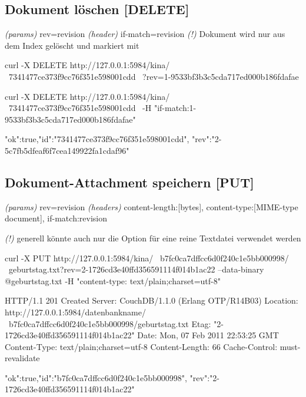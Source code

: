\documentclass[19pt,landscape,twocolumn]{article}
\newcommand{\mono}[1]{\texttt{\textendash\textendash {#1}}}
\newcommand{\htmlverb}[1]{{[}\textbf{{#1}}{]}}
\newcommand{\brackets}[1]{{[}{#1}{]}}
\newcommand{\setparskip}{\setlength{\parskip}{-6mm}}
\newcommand{\resetparskip}{\setlength{\parskip}{1mm}}
\begin{document}
\subsection{Dokument löschen \htmlverb{DELETE}}
\emph{(params)} rev=revision \newline
\emph{(header)} if-match=revision \newline
\emph{(!)} Dokument wird nur aus dem Index gelöscht und markiert \newline
 mit \mono{deleted:true}

\begin{code}
curl -X DELETE http://127.0.0.1:5984/kina/ \
  7341477ce373f9cc76f351e598001cdd \
  ?rev=1-9533bf3b3c5cda717ed000b186fdafae
\end{code}

\begin{code}
curl -X DELETE http://127.0.0.1:5984/kina/ \
  7341477ce373f9cc76f351e598001cdd \
  -H "if-match:1-9533bf3b3c5cda717ed000b186fdafae"
\end{code}
\setparskip
\begin{response}
{"ok":true,"id":"7341477ce373f9cc76f351e598001cdd",
 "rev":"2-5c7fb5dfeaf6f7cea149922fa1cdaf96"}
\end{response}
\resetparskip

\subsection{Dokument-Attachment speichern \htmlverb{PUT}}
\emph{(params)} rev=revision \newline
\emph{(headers)} content-length:\brackets{bytes}, content-type:\brackets{MIME-type document}, if-match:revision

\emph{(!)} generell könnte auch nur die Option \mono{data} für eine reine Textdatei \newline
verwendet werden

\begin{code}
curl -X PUT http://127.0.0.1:5984/kina/ \
  b7fc0ca7dffcc6d0f240c1e5bb000998/ \
  geburtstag.txt?rev=2-1726cd3e40ffd356591114f014b1ac22
     --data-binary @geburtstag.txt
     -H "content-type: text/plain;charset=utf-8"
\end{code}
\setparskip
\begin{response}
HTTP/1.1 201 Created
Server: CouchDB/1.1.0 (Erlang OTP/R14B03)
Location: http://127.0.0.1:5984/datenbankname/ \
  b7fc0ca7dffcc6d0f240c1e5bb000998/geburtstag.txt
Etag: "2-1726cd3e40ffd356591114f014b1ac22"
Date: Mon, 07 Feb 2011 22:53:25 GMT
Content-Type: text/plain;charset=utf-8
Content-Length: 66
Cache-Control: must-revalidate

{"ok":true,"id":"b7fc0ca7dffcc6d0f240c1e5bb000998",
 "rev":"2-1726cd3e40ffd356591114f014b1ac22"}
\end{response}
\resetparskip
\end{document}

